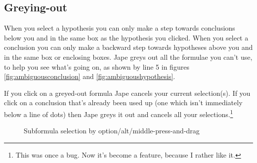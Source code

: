\documentclass[11pt]{book}
\begin{document}
\subsection{Greying-out}

When you select a hypothesis you can only make a step towards conclusions below you and in the same box as the hypothesis you clicked. When you select a conclusion you can only make a backward step towards hypotheses above you and in the same box or enclosing boxes. Jape greys out all the formulae you can't use, to help you see what's going on, as shown by line 5 in figures \ref{fig:ambiguousconclusion} and \ref{fig:ambiguoushypothesis}. 

If you click on a greyed-out formula Jape cancels your current selection(s). If you click on a conclusion that's already been used up (one which isn't immediately below a line of dots) then Jape greys it out and cancels all your selections.\footnote{This was once a bug. Now it's become a feature, because I rather like it.}

\begin{figure}
\centering
{}
\quad
{}
\caption{Subformula selection by option/alt/middle-press-and-drag}
\end{figure}
\end{document}
